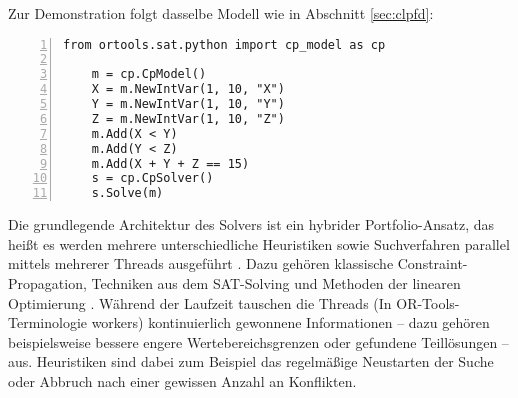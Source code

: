 \documentclass[12pt,a4paper]{article}
\begin{document}
\noindent
Zur Demonstration folgt dasselbe Modell wie in Abschnitt \ref{sec:clpfd}:

\begin{Verbatim}[numbers=left, xleftmargin=5mm, frame=lines]
    from ortools.sat.python import cp_model as cp

    m = cp.CpModel()
    X = m.NewIntVar(1, 10, "X")
    Y = m.NewIntVar(1, 10, "Y")
    Z = m.NewIntVar(1, 10, "Z")
    m.Add(X < Y)
    m.Add(Y < Z)
    m.Add(X + Y + Z == 15)
    s = cp.CpSolver()
    s.Solve(m)

\end{Verbatim}

Die grundlegende Architektur des Solvers ist ein hybrider Portfolio-Ansatz, das heißt es werden mehrere unterschiedliche Heuristiken sowie Suchverfahren parallel mittels mehrerer Threads ausgeführt \cite{perron}.
Dazu gehören klassische Constraint-Propagation, Techniken aus dem SAT-Solving und Methoden der linearen Optimierung \cite{cp-sat-primer}.
Während der Laufzeit tauschen die Threads (In OR-Tools-Terminologie \glqq workers\grqq{}) kontinuierlich gewonnene Informationen -- dazu gehören beispielsweise bessere engere Wertebereichsgrenzen oder gefundene Teillösungen -- aus.
Heuristiken sind dabei zum Beispiel das regelmäßige Neustarten der Suche oder Abbruch nach einer gewissen Anzahl an Konflikten.
\end{document}
